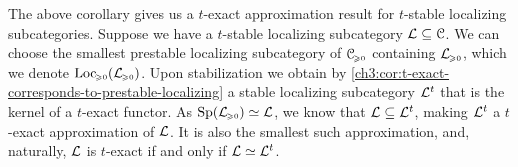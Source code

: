 

\begin{remark}
    \label{ch3:rm:t-exact-approximation}
    The above corollary gives us a $t$-exact approximation result for $t$-stable localizing subcategories. Suppose we have a $t$-stable localizing subcategory $\mathcal{L}\subseteq \EuScript{C}$. We can choose the smallest prestable localizing subcategory of $\EuScript{C}_{\hspace{-1pt}\scriptscriptstyle\geqslant 0}$ containing $\mathcal{L}_{\hspace{-1pt}\scriptscriptstyle\geqslant 0}$, which we denote $\operatorname{Loc}_{\hspace{-1pt}\scriptscriptstyle\geqslant 0}(\mathcal{L}_{\hspace{-1pt}\scriptscriptstyle\geqslant 0})$. Upon stabilization we obtain by \cref{ch3:cor:t-exact-corresponds-to-prestable-localizing} a stable localizing subcategory $\mathcal{L}^t$
    that is the kernel of a $t$-exact functor. As $\mathrm{Sp}(\mathcal{L}_{\hspace{-1pt}\scriptscriptstyle\geqslant 0})\simeq \mathcal{L}$, we know that $\mathcal{L}\subseteq \mathcal{L}^t$, making $\mathcal{L}^t$ a $t$-exact approximation of $\mathcal{L}$. It is also the smallest such approximation, and, naturally, $\mathcal{L}$ is $t$-exact if and only if $\mathcal{L}\simeq \mathcal{L}^t$. 
\end{remark}





